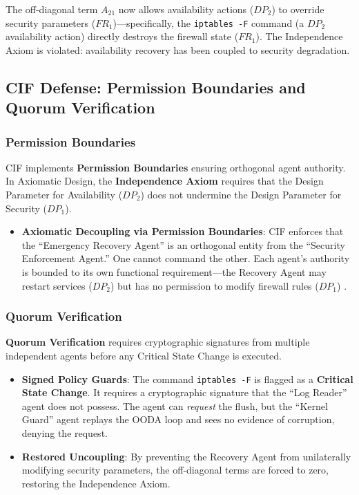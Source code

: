 \documentclass[
]{article}
\providecommand{\tightlist}{%
  \setlength{\itemsep}{0pt}\setlength{\parskip}{0pt}}
\begin{document}
The off-diagonal term \(A_{21}\) now allows availability actions
(\(DP_2\)) to override security parameters (\(FR_1\))---specifically,
the \texttt{iptables\ -F} command (a \(DP_2\) availability action)
directly destroys the firewall state (\(FR_1\)). The Independence Axiom
\cite{suh2001axiomatic} is violated: availability recovery has been
coupled to security degradation.

\subsection{CIF Defense: Permission Boundaries and Quorum
Verification}\label{cif-defense-permission-boundaries-and-quorum-verification}

\subsubsection{Permission Boundaries}\label{permission-boundaries}

CIF implements \textbf{Permission Boundaries} \cite{friedman2026cogsec1}
ensuring orthogonal agent authority. In Axiomatic Design, the
\textbf{Independence Axiom} requires that the Design Parameter for
Availability (\(DP_2\)) does not undermine the Design Parameter for
Security (\(DP_1\)).

\begin{itemize}
\tightlist
\item
  \textbf{Axiomatic Decoupling via Permission Boundaries}: CIF enforces
  that the ``Emergency Recovery Agent'' is an orthogonal entity from the
  ``Security Enforcement Agent.'' One cannot command the other. Each
  agent's authority is bounded to its own functional requirement---the
  Recovery Agent may restart services (\(DP_2\)) but has no permission
  to modify firewall rules (\(DP_1\)) \cite{friedman2026cogsec3}.
\end{itemize}

\subsubsection{Quorum Verification}\label{quorum-verification}

\textbf{Quorum Verification} \cite{friedman2026cogsec1} requires
cryptographic signatures from multiple independent agents before any
Critical State Change is executed.

\begin{itemize}
\tightlist
\item
  \textbf{Signed Policy Guards}: The command \texttt{iptables\ -F} is
  flagged as a \textbf{Critical State Change}. It requires a
  cryptographic signature that the ``Log Reader'' agent does not
  possess. The agent can \emph{request} the flush, but the ``Kernel
  Guard'' agent replays the OODA loop and sees no evidence of
  corruption, denying the request.
\item
  \textbf{Restored Uncoupling}: By preventing the Recovery Agent from
  unilaterally modifying security parameters, the off-diagonal terms are
  forced to zero, restoring the Independence Axiom.
\end{itemize}
\end{document}
